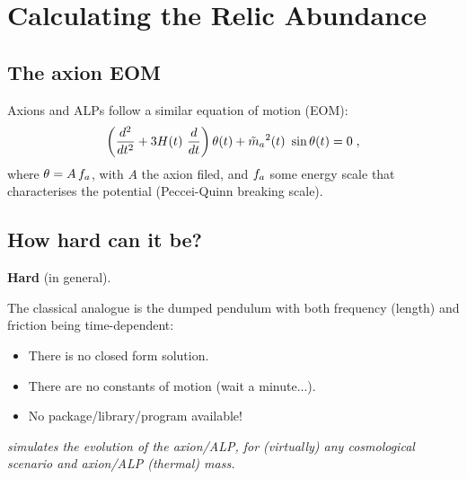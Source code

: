 \documentclass[10pt,utf8,compress,xcolor=dvipsnames]{beamer}
\begin{document}
\section{Calculating the Relic Abundance}
\subsection{The axion EOM}
\begin{frame}{\insertsubsectionhead}
	Axions and ALPs follow a similar equation of motion (EOM):
	\begin{equation*}
		\left( \dfrac{d^2}{d t^2} + 3 H(t) \ \dfrac{d}{d t}  \right) \theta(t) + \tilde m_{a}{}^2(t) \ \sin \theta(t) = 0 \; ,
	\end{equation*}	
	where $\theta= A \, f_{a}{}$, with $A$ the axion filed, and $f_{a}{}$ some energy scale that characterises the potential (Peccei-Quinn breaking scale).
	
	
\end{frame}

\subsection{How hard can it be?}
\begin{frame}{\insertsubsectionhead}
	\begin{center}
		\textbf{Hard} (in general).\\[1cm]\pause
	\end{center}	
	
	The classical analogue is the dumped pendulum with both frequency (length) and friction being time-dependent:
	\begin{itemize}
		\item There is no closed form solution.
		\item There are no constants of motion (wait a minute...).
		\item No package/library/program available!\pause\\[2cm]
	\end{itemize}
	
	\begin{center}
		{\sl \mimes simulates the evolution of the axion/ALP, for (virtually) any cosmological scenario and axion/ALP (thermal) mass.}
	\end{center}		
\end{frame}
\end{document}
